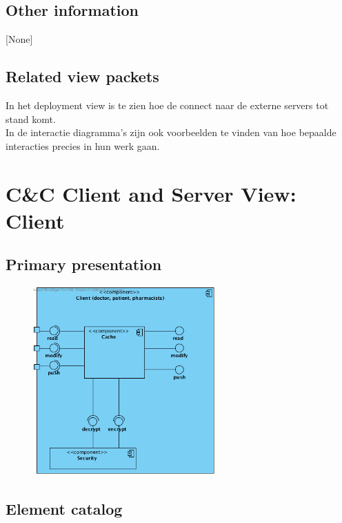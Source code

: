 \documentclass[a4paper,10pt]{article}
\begin{document}
\subsection{Other information}
[None]

\subsection{Related view packets}
In het deployment view is te zien hoe de connect naar de externe servers tot stand komt.\\
In de interactie diagramma's zijn ook voorbeelden te vinden van hoe bepaalde interacties precies in hun werk gaan.


\clearpage
\section{C\&C Client and Server View: Client}
\label{Client and Server View: Client}

\subsection{Primary presentation}

\begin{center}
    \begin{figure}[!h]
      \includegraphics[width=70mm]{../images/ClientServer_Client.png}
    \end{figure}
  \end{center}

\subsection{Element catalog}
\end{document}

